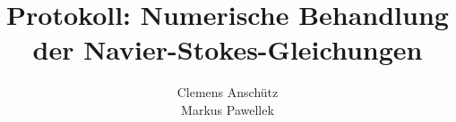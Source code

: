 


\title{Protokoll: Numerische Behandlung der Navier-Stokes-Gleichungen}
\author{Clemens Anschütz \\ Markus Pawellek}

\usepackage[font=footnotesize]{subcaption}


	
	\maketitle
	\tableofcontents
	\newpage
	\thispagestyle{empty}
	\null
	\newpage
	
	\newpage
	
	\newpage
	\FloatBarrier
	
	\newpage
	\FloatBarrier
	
	\newpage
	\FloatBarrier
	
	\newpage
	\FloatBarrier
	
	\newpage
	\FloatBarrier

	\appendix
	
	\newpage
	\FloatBarrier
	

	\nocite{gds}
	\nocite{cmfd}

